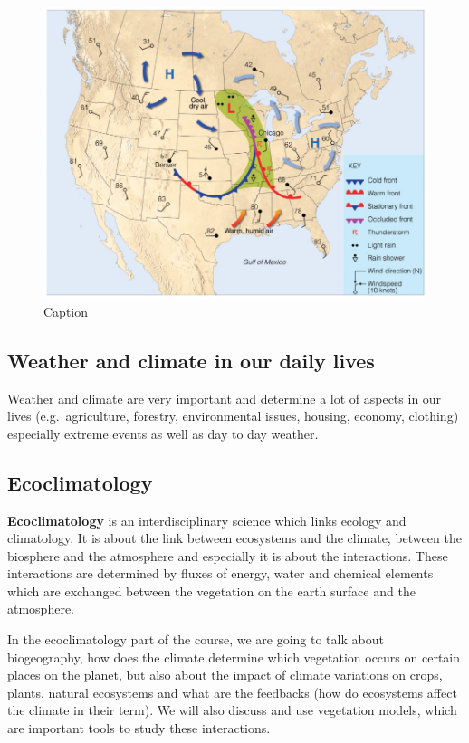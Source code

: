 \documentclass[12pt,oneside]{book}
\begin{document}
\begin{figure}

{\centering \includegraphics[width=0.5\linewidth]{figures/Figure18} 

}

\caption{Caption}\label{fig:History2}
\end{figure}

\subsection{Weather and climate in our daily
lives}\label{weather-and-climate-in-our-daily-lives}

Weather and climate are very important and determine a lot of aspects in
our lives (e.g.~agriculture, forestry, environmental issues, housing,
economy, clothing) especially extreme events as well as day to day
weather.

\subsection{Ecoclimatology}\label{ecoclimatology}

\textbf{Ecoclimatology} is an interdisciplinary science which links
ecology and climatology. It is about the link between ecosystems and the
climate, between the biosphere and the atmosphere and especially it is
about the interactions. These interactions are determined by fluxes of
energy, water and chemical elements which are exchanged between the
vegetation on the earth surface and the atmosphere.

In the ecoclimatology part of the course, we are going to talk about
biogeography, how does the climate determine which vegetation occurs on
certain places on the planet, but also about the impact of climate
variations on crops, plants, natural ecosystems and what are the
feedbacks (how do ecosystems affect the climate in their term). We will
also discuss and use vegetation models, which are important tools to
study these interactions.
\end{document}
